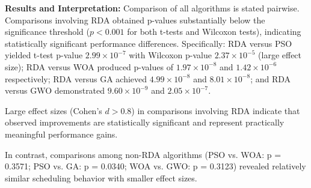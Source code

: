 \documentclass[pdflatex,sn-mathphys-num]{sn-jnl}%
\begin{document}
\begin{table}[htbp]
\centering
\caption{Statistical comparison of scheduling algorithms}
\label{tab:statistical_tests}
\end{table}

\textbf{Results and Interpretation:} Comparison of all algorithms is stated pairwise. Comparisons involving RDA obtained p-values substantially below the significance threshold ($p < 0.001$ for both t-tests and Wilcoxon tests), indicating statistically significant performance differences. Specifically: RDA versus PSO yielded t-test p-value $2.99 \times 10^{-7}$ with Wilcoxon p-value $2.37 \times 10^{-5}$ (large effect size); RDA versus WOA produced p-values of $1.97 \times 10^{-8}$ and $1.42 \times 10^{-6}$ respectively; RDA versus GA achieved $4.99 \times 10^{-8}$ and $8.01 \times 10^{-8}$; and RDA versus GWO demonstrated $9.60 \times 10^{-9}$ and $2.05 \times 10^{-7}$.

Large effect sizes (Cohen's $d > 0.8$) in comparisons involving RDA indicate that observed improvements are  statistically significant and represent practically meaningful performance gains.

In contrast, comparisons among non-RDA algorithms (PSO vs. WOA: p = 0.3571; PSO vs. GA: p = 0.0340; WOA vs. GWO: p = 0.3123) revealed relatively similar scheduling behavior with smaller effect sizes.
\end{document}
